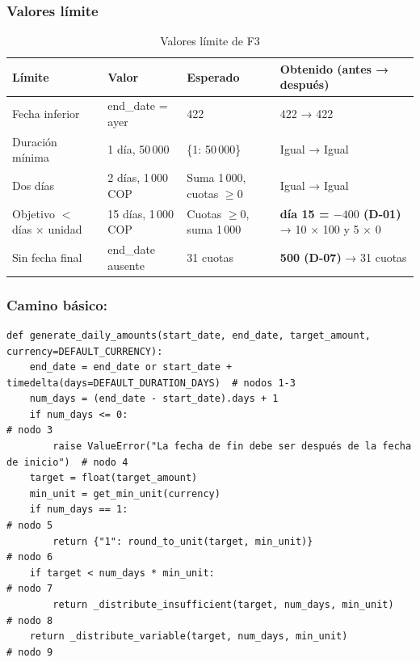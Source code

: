 \subsubsection{Valores límite}

\begin{table}[H]
\caption{Valores límite de F3}
\label{tab:vl-f3}
\footnotesize
\begin{tabularx}{\linewidth}{L{3.2cm} L{3.4cm} L{3cm} Y}
\toprule
Límite & Valor & Esperado & Obtenido (antes → después) \\
\midrule
Fecha inferior & end\_date = ayer & 422 & 422 → 422 \\
Duración mínima & 1 día, 50\,000 & \{1: 50\,000\} & Igual → Igual \\
Dos días & 2 días, 1\,000 COP & Suma 1\,000, cuotas $\geq 0$ & Igual → Igual \\
Objetivo $<$ días × unidad & 15 días, 1\,000 COP & Cuotas $\geq 0$, suma 1\,000 & \textbf{día 15 = $-400$ (D-01)} → 10 × 100 y 5 × 0 \\
Sin fecha final & end\_date ausente & 31 cuotas & \textbf{500 (D-07)} → 31 cuotas \\
\bottomrule
\end{tabularx}
\end{table}

\subsubsection{Camino básico: \texorpdfstring{}{saving_service.generate_daily_amounts}}

\begin{verbatim}
def generate_daily_amounts(start_date, end_date, target_amount, currency=DEFAULT_CURRENCY):
    end_date = end_date or start_date + timedelta(days=DEFAULT_DURATION_DAYS)  # nodos 1-3
    num_days = (end_date - start_date).days + 1
    if num_days <= 0:                                                         # nodo 3
        raise ValueError("La fecha de fin debe ser después de la fecha de inicio")  # nodo 4
    target = float(target_amount)
    min_unit = get_min_unit(currency)
    if num_days == 1:                                                         # nodo 5
        return {"1": round_to_unit(target, min_unit)}                         # nodo 6
    if target < num_days * min_unit:                                          # nodo 7
        return _distribute_insufficient(target, num_days, min_unit)           # nodo 8
    return _distribute_variable(target, num_days, min_unit)                   # nodo 9
\end{verbatim}

